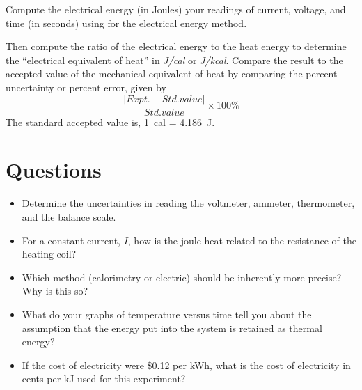 \begin{multicols}{2}
Compute the electrical energy (in Joules) your readings of current, voltage, and time (in seconds) using   for the electrical energy  method.

Then compute the ratio of the electrical energy to the heat energy to determine the ``electrical equivalent of heat'' in \emph{J/cal} or \emph{J/kcal}. Compare the result to the accepted value of the mechanical equivalent of heat by comparing the percent uncertainty or percent error, given by
\[ \frac{|Expt. - Std. value|}{Std. value} \times 100\% \]
 The standard accepted value is, 1~cal = 4.186~J.

\end{multicols}
\section{Questions}
\begin{itemize}
	\item Determine the uncertainties in reading the voltmeter, ammeter, thermometer, and the balance scale.
	\item For a constant current, $I$, how is the joule heat related to the resistance of the heating coil?
	\item Which method (calorimetry or electric) should be inherently more precise?  Why is this so?
	\item What do your graphs of temperature versus time tell you about the assumption that the energy put into the system is retained as thermal energy?
	\item If the cost of electricity were \$0.12 per kWh, what is the cost of electricity in cents per kJ used for this experiment?
\end{itemize}

\endinput
